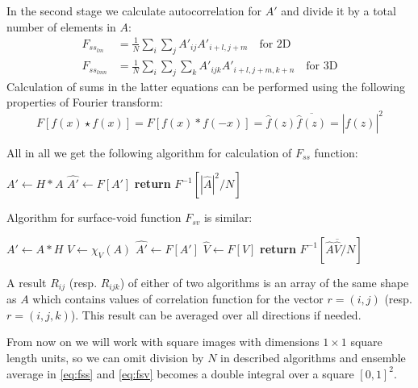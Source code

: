 \documentclass[reprint,amsmath,amssymb,aps,pre,showkeys,showpacs]{revtex4-1}
\begin{document}
In the second stage we calculate autocorrelation for $A'$ and divide it by a
total number of elements in $A$:
\begin{align*}
  F_{{ss}_{lm}} &= \frac{1}{N} \sum_i \sum_j A'_{ij}A'_{i+l, j+m} \quad
  \text{for 2D} \\
  F_{{ss}_{lmn}} &= \frac{1}{N} \sum_i \sum_j \sum_k A'_{ijk}A'_{i+l, j+m, k+n}
  \quad \text{for 3D}
\end{align*}
Calculation of sums in the latter equations can be performed using the following
properties of Fourier transform:
\begin{equation*}
  F[f(x) \star f(x)] = F[f(x) * f(-x)] = \hat{f}(z)\overline{\hat{f}(z)} = |\hat{f}(z)|^2
\end{equation*}

All in all we get the following algorithm for calculation of $F_{ss}$ function:
\begin{algorithmic}[1]
  \State $A' \gets H*A$
  \State $\hat{A'} \gets F[A']$
  \State \textbf{return} $F^{-1}[ |\hat{A}|^2 / N]$
  \EndProcedure
\end{algorithmic}

Algorithm for surface-void function $F_{sv}$ is similar:
\begin{algorithmic}[1]
  \State $A' \gets A*H$
  \State $V \gets \chi_V(A)$
  \State $\hat{A'} \gets F[A']$
  \State $\hat{V} \gets F[V]$
  \State \textbf{return} $F^{-1}[ \hat{A}\overline{\hat{V}} / N]$
  \EndProcedure
\end{algorithmic}

A result $R_{ij}$ (resp. $R_{ijk}$) of either of two algorithms is an array of
the same shape as $A$ which contains values of correlation function for the
vector $r = (i, j)$ (resp. $r = (i, j, k)$). This result can be averaged over
all directions if needed.

From now on we will work with square images with dimensions $1 \times 1$ square
length units, so we can omit division by $N$ in described algorithms and
ensemble average in \cref{eq:fss} and \cref{eq:fsv} becomes a double integral
over a square $[0, 1]^2$.
\end{document}
